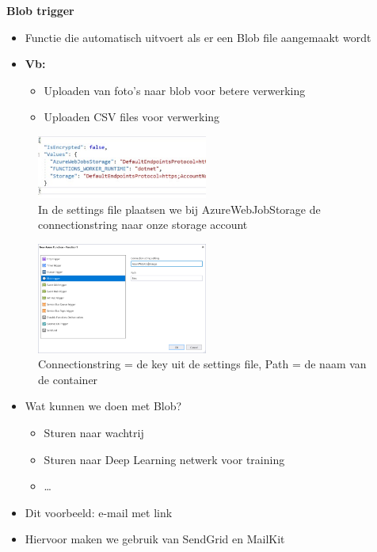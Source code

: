 \documentclass{article}
\newcommand{\bold}[1]{\textbf{#1}}
\begin{document}
\bold{Blob trigger}

\begin{itemize}
    \item Functie die automatisch uitvoert als er een Blob file aangemaakt wordt
    \item \bold{Vb:}
    \begin{itemize}
        \item Uploaden van foto's naar blob voor betere verwerking
        \item Uploaden CSV files voor verwerking
    \end{itemize}
\end{itemize}

\begin{figure}[H]
    \centering
    \includegraphics[width=0.5\textwidth]{scenario-2-1.png}
    \caption{In de settings file plaatsen we bij AzureWebJobStorage de connectionstring naar onze storage account}
\end{figure}

\begin{figure}[H]
    \centering
    \includegraphics[width=0.5\textwidth]{scenario-2-2.png}
    \caption{Connectionstring = de key uit de settings file, Path = de naam van de container}
\end{figure}

\begin{itemize}
    \item Wat kunnen we doen met Blob?
    \begin{itemize}
        \item Sturen naar wachtrij
        \item Sturen naar Deep Learning netwerk voor training
        \item \dots
    \end{itemize}
    \item Dit voorbeeld: e-mail met link
    \item Hiervoor maken we gebruik van SendGrid en MailKit
\end{itemize}
\end{document}
